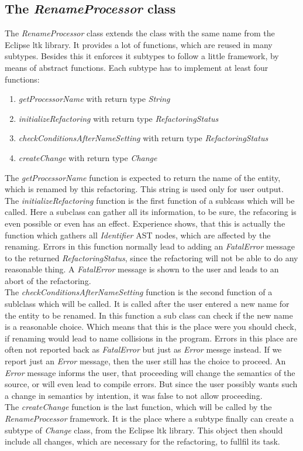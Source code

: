 \documentclass[a4paper,10pt]{report}
\begin{document}
\subsection{The {\it RenameProcessor} class}
\label{RenameProcessor}
The {\it RenameProcessor} class extends the class with the same name from the Eclipse ltk library. It provides a lot of functions, which are reused in many subtypes. Besides this it enforces it subtypes to follow a little framework, by means of abstract functions.
Each subtype has to implement at least four functions:
   \begin{enumerate}
     \item {\it getProcessorName} with return type {\it String}
     \item {\it initializeRefactoring} with return type {\it RefactoringStatus}
     \item {\it checkConditionsAfterNameSetting}  with return type {\it RefactoringStatus}
     \item {\it createChange}  with return type {\it Change}
   \end{enumerate}
The {\it getProcessorName} function is expected to return the name of the entity, which is renamed by this refactoring. This string is used only for user output.\\
The {\it initializeRefactoring} function is the first function of a sublcass which will be called.
Here a subclass can gather all its information, to be sure, the refacoring is even possible or even has an effect.
Experience shows, that this is actually the function which gathers all {\it Identifier} AST nodes, which are affected by the renaming.
Errors in this function normally lead to adding an {\it FatalError} message to the returned {\it RefactoringStatus}, since the refactoring
will not be able to do any reasonable thing. A {\it FatalError} message is shown to the user and leads to an abort of the refactoring.\\
The {\it checkConditionsAfterNameSetting} function is the second function of a sublclass which will be called.
It is called after the user entered a new name for the entity to be renamed.
In this function a sub class can check if the new name is a reasonable choice.
Which means that this is the place were you should check, if renaming would lead to name collisions in the program.
Errors in this place are often not reported back as {\it FatalError} but just as {\it Error} messge instead.
If we report just an {\it Error} message, then the user still has the choice to  proceed. An {\it Error} message informs the user, that proceeding
will change the semantics of the source, or will even lead to compile errors. But since the user possibly wants such a change in semantics by intention, it was false to not allow proceeding.\\
The {\it createChange} function is the last function, which will be called by the {\it RenameProcessor} framework. It is the place where a subtype finally can create a subtype of {\it Change} class, from the Eclipse ltk library.
This object then should include all changes, which are necessary for the refactoring, to fullfil its task.
\end{document}
